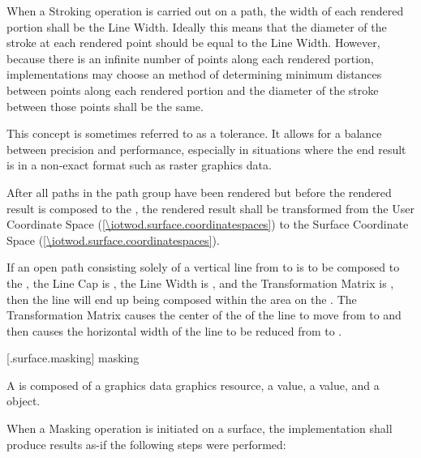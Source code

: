\pnum
When a Stroking operation is carried out on a path, the width of each rendered portion shall be the Line Width. Ideally this means that the diameter of the stroke at each rendered point should be equal to the Line Width. However, because there is an infinite number of points along each rendered portion, implementations may choose an \unspecnorm method of determining minimum distances between points along each rendered portion and the diameter of the stroke between those points shall be the same.
\begin{note}
This concept is sometimes referred to as a tolerance. It allows for a balance between precision and performance, especially in situations where the end result is in a non-exact format such as raster graphics data.
\end{note}

\pnum
After all paths in the path group have been rendered but before the rendered result is composed to the \underlyingsurface, the rendered result shall be transformed from the User Coordinate Space (\ref{\iotwod.surface.coordinatespaces}) to the Surface Coordinate Space (\ref{\iotwod.surface.coordinatespaces}).
\begin{example}
If an open path consisting solely of a vertical line from  to  is to be composed to the \underlyingsurface, the Line Cap is , the Line Width is , and the Transformation Matrix is , then the line will end up being composed within the area  on the \underlyingsurface. The Transformation Matrix causes the center of the \xaxis of the line to move from  to  and then causes the horizontal width of the line to be reduced from  to .
\end{example}

 [\iotwod.surface.masking] { masking}

\pnum
A  is composed of a graphics data graphics resource, a  value, a  value, and a  object.

\pnum
When a Masking operation is initiated on a surface, the implementation shall produce results as-if the following steps were performed:

